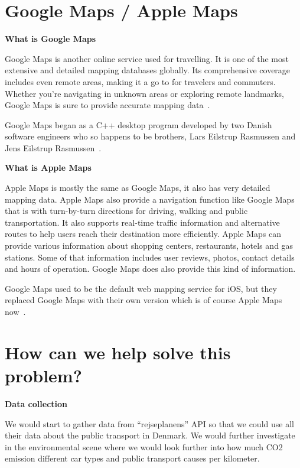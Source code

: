 \section{Google Maps / Apple Maps}\label{sec:google-maps-/-apple-maps}

\textbf{What is Google Maps}

Google Maps is another online service used for travelling.
It is one of the most extensive and detailed mapping databases globally.
Its comprehensive coverage includes even remote areas, making it a go to for travelers and commuters.
Whether you're navigating in unknown areas or exploring remote landmarks, Google Maps is sure to provide accurate
mapping data~\cite{googlemaps2023}. \newline

Google Maps began as a C++ desktop program developed by two Danish software engineers who so happens to be brothers,
Lars Eilstrup Rasmussen and Jens Eilstrup Rasmussen~\cite{googlemaps2023}. \newline

\textbf{What is Apple Maps}

Apple Maps is mostly the same as Google Maps, it also has very detailed mapping data.
Apple Maps also provide a navigation function like Google Maps that is with turn-by-turn directions for driving, walking
and public transportation.
It also supports real-time traffic information and alternative routes to help users reach their destination more
efficiently.
Apple Maps can provide various information about shopping centers, restaurants, hotels and gas stations.
Some of that information includes user reviews, photos, contact details and hours of operation.
Google Maps does also provide this kind of information. \newline

Google Maps used to be the default web mapping service for iOS, but they replaced Google Maps with their own version
which is of course Apple Maps now~\cite{applemaps2023}. \newline


\section{How can we help solve this problem?}\label{sec:how-can-we-help-solve-this-problem?}

\textbf{Data collection}

We would start to gather data from ``rejseplanens'' API so that we could use all their data about the public transport
in Denmark.
We would further investigate in the environmental scene where we would look further into how much CO2 emission different
car types and public transport causes per kilometer.

